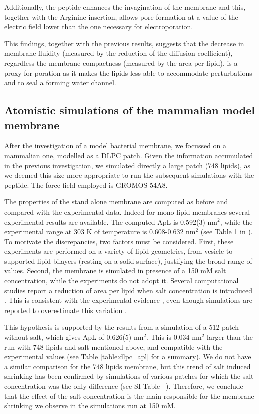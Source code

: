 Additionally, the peptide enhances the invagination of the membrane and this, together with the Arginine insertion, allows pore formation at a value of the electric field lower than the one necessary for electroporation.

This findings, together with the previous results, suggests that the decrease in membrane fluidity (measured by the reduction of the diffusion coefficient), regardless the membrane compactness (measured by the area per lipid), is a proxy for poration as it makes the lipids less able to accommodate perturbations and to seal a forming water channel.


\subsection{Atomistic simulations of the mammalian model membrane} \label{sec:lip_atom_mamm}

After the investigation of a model bacterial membrane, we focussed on a mammalian one, modelled as a DLPC patch. Given the information accumulated in the previous investigation, we simulated directly a large patch (748 lipids), as we deemed this size more appropriate to run the subsequent simulations with the peptide. The force field employed is GROMOS 54A8.

The properties of the stand alone membrane are computed as before and compared with the experimental data. Indeed for mono-lipid membranes several experimental results are available. The computed ApL is 0.592(3) nm$^2$, while the experimental range at 303 K of temperature is 0.608-0.632 nm$^2$ (see Table 1 in \citet{Poger2016}). To motivate the discrepancies, two factors must be considered. First, these experiments are performed on a variety of lipid geometries, from vesicle to supported lipid bilayers (resting on a solid surface), justifying the broad range of values. Second, the membrane is simulated in presence of a 150 mM salt concentration, while the experiments do not adopt it. Several computational studies report a reduction of area per lipid when salt concentration is introduced \citep{Bockmann2003,Jarerattanachat2013,Reif2017}. This is consistent with the experimental evidence \citep{Pabst2007}, even though simulations are reported to overestimate this variation \citep{Reif2017}.

This hypothesis is supported by the results from a simulation of a 512 patch without salt, which gives ApL of 0.626(5) nm$^2$. This is 0.034 nm$^2$ larger than the run with 748 lipids and salt mentioned above, and compatible with the experimental values (see Table \ref{table:dlpc_apl} for a summary). We do not have a similar comparison for the 748 lipids membrane, but this trend of salt induced shrinking has been confirmed by simulations of various patches for which the salt concentration was the only difference (see SI Table --).
%
Therefore, we conclude that the effect of the salt concentration is the main responsible for the membrane shrinking we observe in the simulations run at 150 mM.

